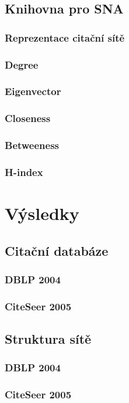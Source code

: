 \documentclass[12pt]{report}
\begin{document}
\section{Knihovna pro SNA}
\lipsum

\subsection{Reprezentace citační sítě}
\subsection{Degree}
\subsection{Eigenvector}
\subsection{Closeness}
\subsection{Betweeness}
\subsection{H-index}

\chapter{Výsledky}
\lipsum
\section{Citační databáze}
\lipsum
\subsection{DBLP 2004}
\subsection{CiteSeer 2005}

\section{Struktura sítě}
\lipsum
\subsection{DBLP 2004}
\subsection{CiteSeer 2005}
\end{document}
